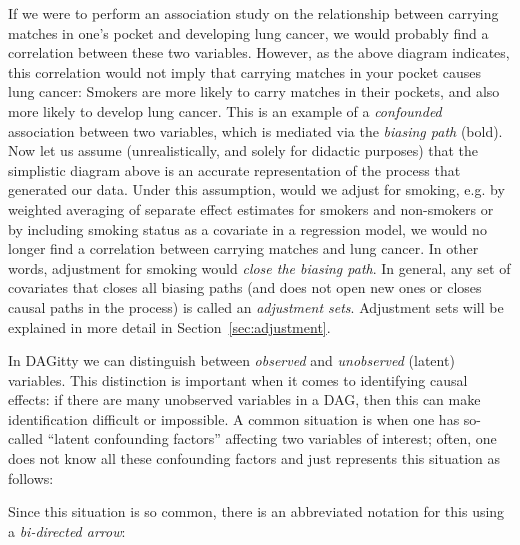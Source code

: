\documentclass[a4paper]{article} %
\newcommand{\pp}{DAGitty\xspace}
\begin{document}
If we were to perform an association 
study on the relationship between carrying matches
in one's pocket and developing lung cancer, we would probably find a 
correlation between these two variables. However, as the above diagram
indicates, this correlation would not imply that carrying matches in 
your pocket causes lung cancer: Smokers are more likely to carry matches
in their pockets, and also more likely to develop lung cancer. This is an
example of a \emph{confounded} association between two variables,
which is mediated via the \emph{biasing path} (bold). 
Now let us assume (unrealistically, and solely for didactic purposes) 
that the simplistic diagram above is an accurate representation of the
process that generated our data. Under this assumption, would we adjust for smoking, 
e.g. by weighted averaging of separate effect estimates for 
smokers and non-smokers or by including smoking status as a covariate
in a regression model, we would  
no longer find a correlation between carrying matches and lung cancer.
In other words, adjustment for smoking would \emph{close the biasing path}.
In general, any set of covariates that closes all biasing paths (and does
not open new ones or closes causal paths in the process) is called an 
\emph{adjustment sets}.  Adjustment sets will be explained in more detail in 
Section~\ref{sec:adjustment}.

In \pp we can distinguish between \emph{observed} and \emph{unobserved} 
(latent) variables. This distinction is important when it comes to identifying 
causal effects: if there are many unobserved variables in a DAG, then this can 
make identification difficult or impossible. A common situation is when one 
has so-called ``latent confounding factors'' affecting two variables of interest; 
often, one does not know all these confounding factors and just represents this 
situation as follows:

 \begin{center}
\end{center}

Since this situation is so common, there is an abbreviated notation for this 
using a \emph{bi-directed arrow}: 

 \begin{center}
\end{center}
\end{document}

